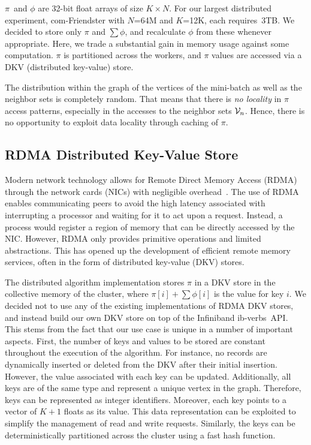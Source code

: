 $\pi$~and $\phi$ are 32-bit float arrays of size $K \times N$. For our
largest distributed experiment, com-Friendster with $N$=64M and $K$=12K, each
requires~3TB. We decided to store only $\pi$ and $\sum\phi$, and recalculate
$\phi$ from these whenever appropriate. Here, we trade a substantial gain
in memory usage against some computation. $\pi$ is partitioned across the workers,
and $\pi$ values are accessed via a DKV (distributed key-value) store.


The distribution within the graph of the vertices of the mini-batch as well as
the neighbor sets is completely random. That means that there is \textit{no
locality}
in $\pi$ access patterns, especially in the accesses to the neighbor sets
$\Neighbors$.
Hence, there is no opportunity to exploit data locality through caching of
$\pi$.

\subsection{RDMA Distributed Key-Value Store}

Modern network technology allows for Remote Direct Memory Access (RDMA)
through the network cards (NICs) with negligible
overhead~\cite{Hamada_infinibandtrade,Beck:2011:PER:2043535.2043537}. The use
of RDMA enables communicating peers to avoid the high latency associated with
interrupting a processor and waiting for it to act upon a request. Instead, a
process would register a region of memory that can be directly accessed by the
NIC. However, RDMA only provides primitive operations and limited abstractions.
This has opened up the development of
efficient remote memory services, often in the form of distributed key-value
(DKV) stores.

The distributed algorithm implementation stores $\pi$ in a DKV store in the
collective memory of the
cluster, where $\pi[i]+\sum\phi[i]$ is the value for key $i$.
%
We decided not
to use any of the existing implementations of RDMA DKV stores, and instead
build our own DKV store on top of the Infiniband ib-verbs~API.
%
This stems from the fact that our use case is unique in a number
of important aspects. First, the number of keys and values to be stored are
constant throughout the execution of the algorithm. For instance, no records
are dynamically inserted or deleted from the DKV after their initial insertion.
However, the value associated with each key can be updated. Additionally, all
keys are of the same type and represent a unique vertex in the graph.
Therefore, keys can be represented as integer identifiers. Moreover, each key
points to a vector of $K+1$ floats as its value.
%
This data representation can be exploited to simplify the management of
read and write requests. Similarly, the keys can be deterministically
partitioned across the cluster using a fast hash function.

